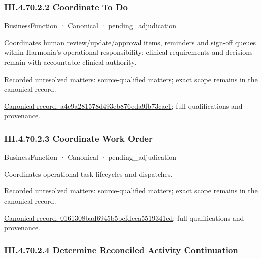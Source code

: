 \subsubsection*{III.4.70.2.2 Coordinate To Do}
\label{navigation:III.4.70.2.2}

\label{element:a4c9a281578d493eb876eda9fb73cac1}
{\small BusinessFunction · Canonical · pending\_adjudication}\par

Coordinates human review/update/approval items, reminders and sign-off queues within Harmonia's operational responsibility; clinical requirements and decisions remain with accountable clinical authority.


{\small Recorded unresolved matters: source-qualified matters; exact scope remains in the canonical record.}\par
{\footnotesize \href{../../../../continuum/business/business-function/a4c9a281578d493eb876eda9fb73cac1.md}{Canonical record: a4c9a281578d493eb876eda9fb73cac1}; full qualifications and provenance.}\par
\subsubsection*{III.4.70.2.3 Coordinate Work Order}
\label{navigation:III.4.70.2.3}

\label{element:0161308bad6945b5bcfdeea5519341cd}
{\small BusinessFunction · Canonical · pending\_adjudication}\par

Coordinates operational task lifecycles and dispatches.


{\small Recorded unresolved matters: source-qualified matters; exact scope remains in the canonical record.}\par
{\footnotesize \href{../../../../continuum/business/business-function/0161308bad6945b5bcfdeea5519341cd.md}{Canonical record: 0161308bad6945b5bcfdeea5519341cd}; full qualifications and provenance.}\par
\subsubsection*{III.4.70.2.4 Determine Reconciled Activity Continuation}
\label{navigation:III.4.70.2.4}

